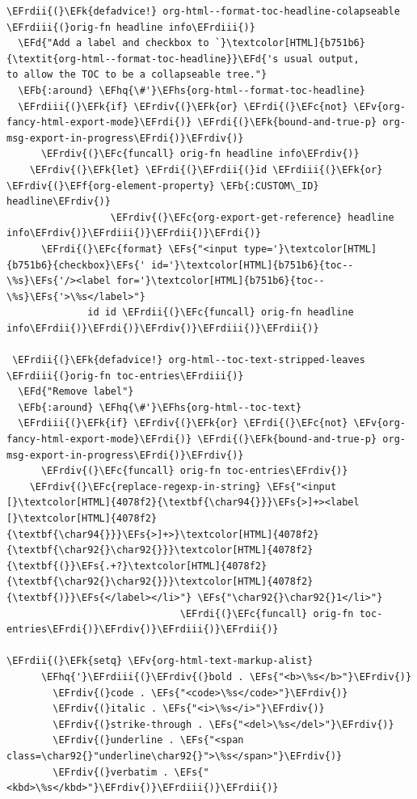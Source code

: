 \documentclass{scrartcl}
\newcommand{\EFk}[1]{\textcolor{EFk}{#1}} %
\newcommand{\EFd}[1]{\textcolor{EFd}{\textit{#1}}} %
\newcommand{\EFs}[1]{\textcolor{EFs}{#1}} %
\newcommand{\EFb}[1]{\textcolor{EFb}{#1}} %
\newcommand{\EFc}[1]{\textcolor{EFc}{#1}} %
\newcommand{\EFv}[1]{\textcolor{EFv}{#1}} %
\newcommand{\EFf}[1]{\textcolor{EFf}{#1}} %
\newcommand{\EFhq}[1]{\textcolor{EFhq}{#1}} %
\newcommand{\EFhs}[1]{\textcolor{EFhs}{#1}} %
\newcommand{\EFrdi}[1]{\textcolor{EFrdi}{#1}} %
\newcommand{\EFrdii}[1]{\textcolor{EFrdii}{#1}} %
\newcommand{\EFrdiii}[1]{\textcolor{EFrdiii}{#1}} %
\newcommand{\EFrdiv}[1]{\textcolor{EFrdiv}{#1}} %
\begin{document}
\begin{Code}
\begin{Verbatim}[]
\EFrdii{(}\EFk{defadvice!} org-html--format-toc-headline-colapseable \EFrdiii{(}orig-fn headline info\EFrdiii{)}
  \EFd{"Add a label and checkbox to `}\textcolor[HTML]{b751b6}{\textit{org-html--format-toc-headline}}\EFd{'s usual output,
to allow the TOC to be a collapseable tree."}
  \EFb{:around} \EFhq{\#'}\EFhs{org-html--format-toc-headline}
  \EFrdiii{(}\EFk{if} \EFrdiv{(}\EFk{or} \EFrdi{(}\EFc{not} \EFv{org-fancy-html-export-mode}\EFrdi{)} \EFrdi{(}\EFk{bound-and-true-p} org-msg-export-in-progress\EFrdi{)}\EFrdiv{)}
      \EFrdiv{(}\EFc{funcall} orig-fn headline info\EFrdiv{)}
    \EFrdiv{(}\EFk{let} \EFrdi{(}\EFrdii{(}id \EFrdiii{(}\EFk{or} \EFrdiv{(}\EFf{org-element-property} \EFb{:CUSTOM\_ID} headline\EFrdiv{)}
                  \EFrdiv{(}\EFc{org-export-get-reference} headline info\EFrdiv{)}\EFrdiii{)}\EFrdii{)}\EFrdi{)}
      \EFrdi{(}\EFc{format} \EFs{"<input type='}\textcolor[HTML]{b751b6}{checkbox}\EFs{' id='}\textcolor[HTML]{b751b6}{toc--\%s}\EFs{'/><label for='}\textcolor[HTML]{b751b6}{toc--\%s}\EFs{'>\%s</label>"}
              id id \EFrdii{(}\EFc{funcall} orig-fn headline info\EFrdii{)}\EFrdi{)}\EFrdiv{)}\EFrdiii{)}\EFrdii{)}

 \EFrdii{(}\EFk{defadvice!} org-html--toc-text-stripped-leaves \EFrdiii{(}orig-fn toc-entries\EFrdiii{)}
  \EFd{"Remove label"}
  \EFb{:around} \EFhq{\#'}\EFhs{org-html--toc-text}
  \EFrdiii{(}\EFk{if} \EFrdiv{(}\EFk{or} \EFrdi{(}\EFc{not} \EFv{org-fancy-html-export-mode}\EFrdi{)} \EFrdi{(}\EFk{bound-and-true-p} org-msg-export-in-progress\EFrdi{)}\EFrdiv{)}
      \EFrdiv{(}\EFc{funcall} orig-fn toc-entries\EFrdiv{)}
    \EFrdiv{(}\EFc{replace-regexp-in-string} \EFs{"<input [}\textcolor[HTML]{4078f2}{\textbf{\char94{}}}\EFs{>]+><label [}\textcolor[HTML]{4078f2}{\textbf{\char94{}}}\EFs{>]+>}\textcolor[HTML]{4078f2}{\textbf{\char92{}\char92{}}}\textcolor[HTML]{4078f2}{\textbf{(}}\EFs{.+?}\textcolor[HTML]{4078f2}{\textbf{\char92{}\char92{}}}\textcolor[HTML]{4078f2}{\textbf{)}}\EFs{</label></li>"} \EFs{"\char92{}\char92{}1</li>"}
                              \EFrdi{(}\EFc{funcall} orig-fn toc-entries\EFrdi{)}\EFrdiv{)}\EFrdiii{)}\EFrdii{)}

\EFrdii{(}\EFk{setq} \EFv{org-html-text-markup-alist}
      \EFhq{'}\EFrdiii{(}\EFrdiv{(}bold . \EFs{"<b>\%s</b>"}\EFrdiv{)}
        \EFrdiv{(}code . \EFs{"<code>\%s</code>"}\EFrdiv{)}
        \EFrdiv{(}italic . \EFs{"<i>\%s</i>"}\EFrdiv{)}
        \EFrdiv{(}strike-through . \EFs{"<del>\%s</del>"}\EFrdiv{)}
        \EFrdiv{(}underline . \EFs{"<span class=\char92{}"underline\char92{}">\%s</span>"}\EFrdiv{)}
        \EFrdiv{(}verbatim . \EFs{"<kbd>\%s</kbd>"}\EFrdiv{)}\EFrdiii{)}\EFrdii{)}


\end{Verbatim}
\end{Code}
\end{document}
